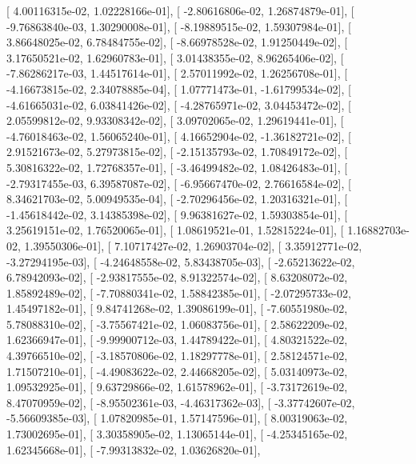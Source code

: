\documentclass{article}
\begin{document}
       [  4.00116315e-02,   1.02228166e-01],
       [ -2.80616806e-02,   1.26874879e-01],
       [ -9.76863840e-03,   1.30290008e-01],
       [ -8.19889515e-02,   1.59307984e-01],
       [  3.86648025e-02,   6.78484755e-02],
       [ -8.66978528e-02,   1.91250449e-02],
       [  3.17650521e-02,   1.62960783e-01],
       [  3.01438355e-02,   8.96265406e-02],
       [ -7.86286217e-03,   1.44517614e-01],
       [  2.57011992e-02,   1.26256708e-01],
       [ -4.16673815e-02,   2.34078885e-04],
       [  1.07771473e-01,  -1.61799534e-02],
       [ -4.61665031e-02,   6.03841426e-02],
       [ -4.28765971e-02,   3.04453472e-02],
       [  2.05599812e-02,   9.93308342e-02],
       [  3.09702065e-02,   1.29619441e-01],
       [ -4.76018463e-02,   1.56065240e-01],
       [  4.16652904e-02,  -1.36182721e-02],
       [  2.91521673e-02,   5.27973815e-02],
       [ -2.15135793e-02,   1.70849172e-02],
       [  5.30816322e-02,   1.72768357e-01],
       [ -3.46499482e-02,   1.08426483e-01],
       [ -2.79317455e-03,   6.39587087e-02],
       [ -6.95667470e-02,   2.76616584e-02],
       [  8.34621703e-02,   5.00949535e-04],
       [ -2.70296456e-02,   1.20316321e-01],
       [ -1.45618442e-02,   3.14385398e-02],
       [  9.96381627e-02,   1.59303854e-01],
       [  3.25619151e-02,   1.76520065e-01],
       [  1.08619521e-01,   1.52815224e-01],
       [  1.16882703e-02,   1.39550306e-01],
       [  7.10717427e-02,   1.26903704e-02],
       [  3.35912771e-02,  -3.27294195e-03],
       [ -4.24648558e-02,   5.83438705e-03],
       [ -2.65213622e-02,   6.78942093e-02],
       [ -2.93817555e-02,   8.91322574e-02],
       [  8.63208072e-02,   1.85892489e-02],
       [ -7.70880341e-02,   1.58842385e-01],
       [ -2.07295733e-02,   1.45497182e-01],
       [  9.84741268e-02,   1.39086199e-01],
       [ -7.60551980e-02,   5.78088310e-02],
       [ -3.75567421e-02,   1.06083756e-01],
       [  2.58622209e-02,   1.62366947e-01],
       [ -9.99900712e-03,   1.44789422e-01],
       [  4.80321522e-02,   4.39766510e-02],
       [ -3.18570806e-02,   1.18297778e-01],
       [  2.58124571e-02,   1.71507210e-01],
       [ -4.49083622e-02,   2.44668205e-02],
       [  5.03140973e-02,   1.09532925e-01],
       [  9.63729866e-02,   1.61578962e-01],
       [ -3.73172619e-02,   8.47070959e-02],
       [ -8.95502361e-03,  -4.46317362e-03],
       [ -3.37742607e-02,  -5.56609385e-03],
       [  1.07820985e-01,   1.57147596e-01],
       [  8.00319063e-02,   1.73002695e-01],
       [  3.30358905e-02,   1.13065144e-01],
       [ -4.25345165e-02,   1.62345668e-01],
       [ -7.99313832e-02,   1.03626820e-01],
\end{document}
